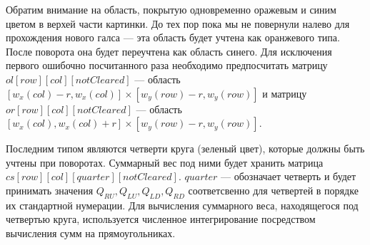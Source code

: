 Обратим внимание на область, покрытую одновременно оражевым и синим цветом в верхей части картинки.
До тех пор пока мы не повернули налево для прохождения нового галса --- эта область будет
учтена как оранжевого типа. После поворота она будет переучтена как область синего.
Для исключения первого ошибочно посчитанного раза необходимо предпосчитать
матрицу $ol[row][col][notCleared]$ --- область $[w_x(col)-r, w_x(col)] \times [w_y(row)-r, w_y(row)]$
и матрицу $or[row][col][notCleared]$ --- область $[w_x(col),w_x(col)+r]\times [w_y(row)-r, w_y(row)]$.

Последним типом являются четверти круга (зеленый цвет), которые должны быть учтены при поворотах.
Суммарный вес под ними будет хранить матрица $cs[row][col][quarter][notCleared]$.
$quarter$ --- обозначает четверть и будет принимать значения $Q_{RU}, Q_{LU}, Q_{LD}, Q_{RD}$
соответсвенно для четвертей в порядке их стандартной нумерации. Для вычисления суммарного
веса, находящегося под четвертью круга, используется численное интегрирование посредством
вычисления сумм на прямоугольниках.
\FloatBarrier
